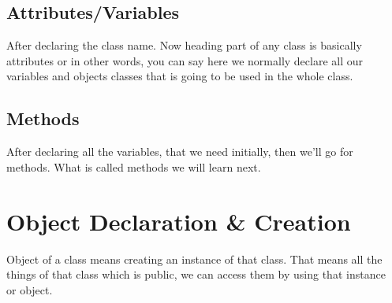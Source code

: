 \documentclass[openany]{book}  %
\begin{document}
\subsection{Attributes/Variables}
After declaring the class name. Now heading part of any class is basically \\
attributes or in other words, you can say here we normally declare all our \\
variables and objects classes that is going to be used in the whole class.
% 
% 
\subsection{Methods}
After declaring all the variables, that we need initially, then we'll go for \\
methods. What is called methods we will learn next.
% 
%
\section{Object Declaration \& Creation}
Object of a class means creating an instance of that class. That means all the \\
things of that class which is public, we can access them by using that instance \\
or object.
\end{document}
